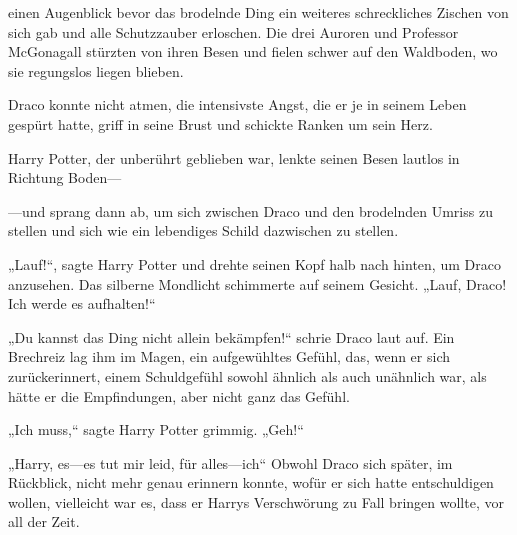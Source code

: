 \begin{em}
einen Augenblick bevor das brodelnde Ding ein weiteres schreckliches Zischen von sich gab und alle Schutzzauber erloschen. Die drei Auroren und Professor McGonagall stürzten von ihren Besen und fielen schwer auf den Waldboden, wo sie regungslos liegen blieben.

Draco konnte nicht atmen, die intensivste Angst, die er je in seinem Leben gespürt hatte, griff in seine Brust und schickte Ranken um sein Herz.

Harry Potter, der unberührt geblieben war, lenkte seinen Besen lautlos in Richtung Boden—

—und sprang dann ab, um sich zwischen Draco und den brodelnden Umriss zu stellen und sich wie ein lebendiges Schild dazwischen zu stellen.

„Lauf!“, sagte Harry Potter und drehte seinen Kopf halb nach hinten, um Draco anzusehen. Das silberne Mondlicht schimmerte auf seinem Gesicht. „Lauf, Draco! Ich werde es aufhalten!“

„Du kannst das Ding nicht allein bekämpfen!“ schrie Draco laut auf.
Ein Brechreiz lag ihm im Magen, ein aufgewühltes Gefühl, das, wenn er sich zurückerinnert, einem Schuldgefühl sowohl ähnlich als auch unähnlich war, als hätte er die Empfindungen, aber nicht ganz das Gefühl.

„Ich muss,“ sagte Harry Potter grimmig. „Geh!“

„Harry, es—es tut mir leid, für alles—ich“
Obwohl Draco sich später, im Rückblick, nicht mehr genau erinnern konnte, wofür er sich hatte entschuldigen wollen, vielleicht war es, dass er Harrys Verschwörung zu Fall bringen wollte, vor all der Zeit.


\end{em}
